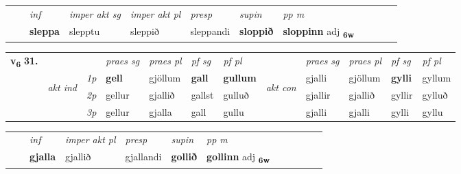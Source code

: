 \begin{tabular}{llllllllllll}
 & & \textit{inf} & \textit{imper akt sg} & \textit{imper akt pl}   & \textit{presp} & \textit{supin}  & \textit{pp m}     \\*
  & & \textbf{sleppa} & slepptu  & sleppið   & sleppandi &  \textbf{sloppið}  & \textbf{sloppinn} adj \textbf{\textsubscript{6w}} \\*
\cmidrule{1-12}
\end{tabular}



\begin{tabular}{llllllllllll} \toprule
\multirow{4}{*}{{{\textbf{v{\textsubscript{6}}} \Large{\textbf{31.}}}}}  & &   &  \textit{praes sg}  & \textit{praes pl}  &\textit{ pf sg} & \textit{pf pl} &  &  \textit{praes sg}  & \textit{praes pl}  & \textit{pf sg} & \textit{pf pl } \\*
	\cmidrule{4-7} \cmidrule{9-12}
 & \multirow{3}{*}{\begin{turn}{90}\textit{akt ind}\end{turn}} & {\textit{1p}} & \textbf{gell} & gjöllum    & \textbf{gall} & \textbf{gullum} & \multirow{3}{*}{\begin{turn}{90}\textit{akt con}\end{turn}} &gjalli & gjöllum & \textbf{gylli} & gyllum\\*
& &  {\textit{2p}} &  gellur  & gjallið   & gallst & gulluð & & gjallir & gjallið & gyllir & gylluð \\*
& &  {\textit{3p}} & gellur & gjalla   & gall & gullu & & gjalli & gjalli& gylli & gyllu  \\*
\cmidrule{4-7} \cmidrule{9-12}
\end{tabular}


\begin{tabular}{llllllllllll}
 & & \textit{inf}  & \textit{imper akt pl}   & \textit{presp} & \textit{supin}  & \textit{pp m}     \\*
  & & \textbf{gjalla}   & gjallið   & gjallandi &  \textbf{gollið}  & \textbf{gollinn} adj \textbf{\textsubscript{6w}} \\*
\cmidrule{1-12}
\end{tabular}



